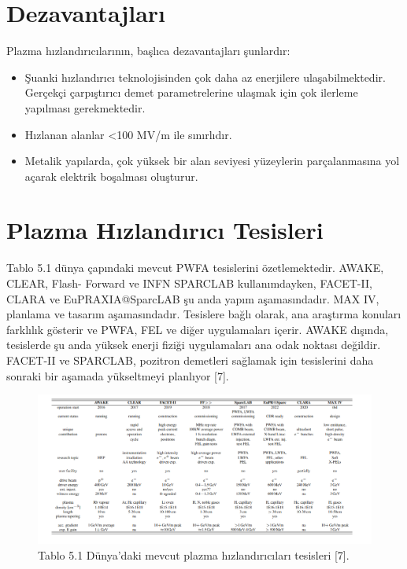 \documentclass{article}
\begin{document}
\section{Dezavantajları}
Plazma hızlandırıcılarının, başlıca dezavantajları şunlardır: 
\begin{itemize}
    \item Şuanki hızlandırıcı teknolojisinden çok daha az enerjilere ulaşabilmektedir. Gerçekçi çarpıştırıcı demet parametrelerine ulaşmak için çok ilerleme yapılması gerekmektedir.
\end{itemize}
\begin{itemize}
    \item Hızlanan alanlar <100 MV/m ile sınırlıdır. 
\end{itemize}
\begin{itemize}
    \item Metalik yapılarda, çok yüksek bir alan seviyesi yüzeylerin parçalanmasına yol açarak elektrik boşalması oluşturur.
\end{itemize}


\section{Plazma Hızlandırıcı Tesisleri}

Tablo 5.1 dünya çapındaki mevcut PWFA tesislerini özetlemektedir. AWAKE, CLEAR, Flash- Forward ve INFN SPARCLAB kullanımdayken, FACET-II, CLARA ve EuPRAXIA@SparcLAB şu anda yapım aşamasındadır. MAX IV, planlama ve tasarım aşamasındadır. Tesislere bağlı olarak, ana araştırma konuları farklılık gösterir ve PWFA, FEL ve diğer uygulamaları içerir. AWAKE dışında, tesislerde şu anda yüksek enerji fiziği uygulamaları ana odak noktası değildir. FACET-II ve SPARCLAB, pozitron demetleri sağlamak için tesislerini daha sonraki bir aşamada yükseltmeyi planlıyor [7].

 \begin{figure}[h]
 \centering
\includegraphics[width=16cm]{tablo1.png}
\caption*{Tablo 5.1 Dünya'daki mevcut plazma hızlandırıcıları tesisleri [7].}
	\end{figure}
	
\end{document}
